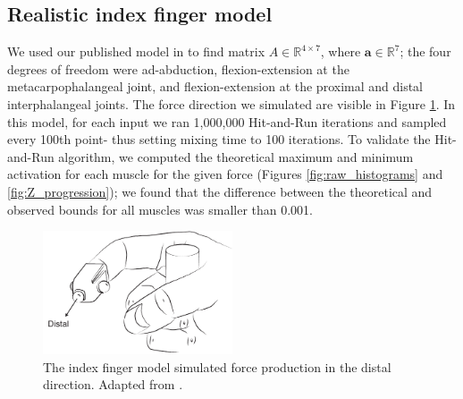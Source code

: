 \subsection{Realistic index finger model}
\label{ss:finger}
We used our published model in \cite{Valero-Cuevas1998Large} to find matrix $A \in \mathbb{R}^{4 \times 7}$, where $\textbf{a} \in \mathbb{R}^7$; the four degrees of freedom were ad-abduction, flexion-extension at the metacarpophalangeal joint, and flexion-extension at the proximal and distal interphalangeal joints.
The force direction we simulated are visible in Figure \ref{fig:finger}.
In this model, for each input we ran 1,000,000 Hit-and-Run iterations and sampled every 100th point- thus setting mixing time to 100 iterations.
To validate the Hit-and-Run algorithm, we computed the theoretical maximum and minimum activation for each muscle for the given force (Figures \ref{fig:raw_histograms} and \ref{fig:Z_progression}); we found that the difference between the theoretical and observed bounds for all muscles was smaller than 0.001.

\begin{figure}[htbp]
  \centering
  \includegraphics[width=0.5\textwidth]{sections/figs/finger.pdf}
  \caption{The index finger model simulated force production in the distal direction. Adapted from \cite{Valero-Cuevas1998Large}.}
  \label{fig:finger}
\end{figure}

